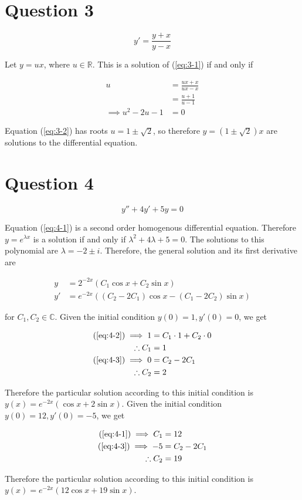 \documentclass{article}
\begin{document}
\section*{Question 3}

\begin{equation} \label{eq:3-1}
    y' = \frac{y + x}{y - x}
\end{equation}

Let $y = ux$, where $u \in \mathbb{R}$. This is a solution of (\ref{eq:3-1}) if and only if

\begin{align}
    u &= \frac{ux + x}{ux - x} \nonumber\\
    &= \frac{u + 1}{u - 1} \nonumber\\
    \implies u^2 - 2u - 1 &= 0 \label{eq:3-2}
\end{align}

Equation (\ref{eq:3-2}) has roots $u = 1 \pm \sqrt{2}$, so therefore $y = (1 \pm \sqrt{2})x$ are solutions to the differential equation.

\section*{Question 4}

\begin{equation} \label{eq:4-1}
    y'' + 4y' + 5y = 0
\end{equation}

Equation (\ref{eq:4-1}) is a second order homogenous differential equation. Therefore $y = e^{\lambda x}$ is a solution if and only if
$\lambda^2 + 4\lambda + 5 = 0$. The solutions to this polynomial are $\lambda = -2 \pm i$. Therefore, the general solution and its
first derivative are

\begin{align}
    y &= 2^{-2x}(C_1\cos x + C_2\sin x) \label{eq:4-2}\\
    y' &= e^{-2x}((C_2 - 2C_1)\cos x - (C_1 - 2C_2)\sin x) \label{eq:4-3}
\end{align}

for $C_1, C_2 \in \mathbb{C}$. Given the initial condition $y(0) = 1, y'(0) = 0$, we get

\begin{align*}
    (\ref{eq:4-2}) \implies 1 &= C_1\cdot 1 + C_2\cdot 0\\
    \therefore C_1 &= 1\\
    (\ref{eq:4-3}) \implies 0 &= C_2 - 2C_1\\
    \therefore C_2 &= 2
\end{align*}

Therefore the particular solution according to this initial condition is $y(x) = e^{-2x}(\cos x + 2\sin x)$. Given the initial condition
$y(0) = 12, y'(0) = -5$, we get

\begin{align*}
    (\ref{eq:4-1}) \implies C_1 &= 12\\
    (\ref{eq:4-3}) \implies -5 &= C_2 - 2C_1\\
    \therefore C_2 &= 19
\end{align*}

Therefore the particular solution according to this initial condition is $y(x) = e^{-2x}(12\cos x + 19\sin x)$.
\end{document}
